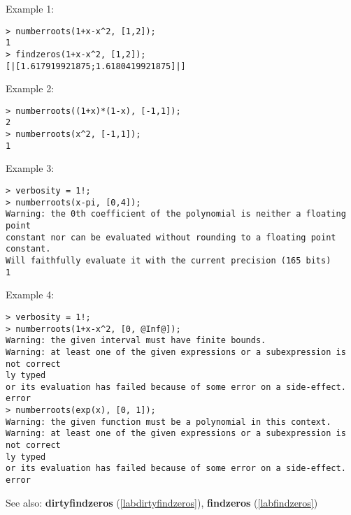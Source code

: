 \noindent Example 1: 
\begin{center}\begin{minipage}{15cm}\begin{Verbatim}[frame=single,commandchars=\\\|\~]
> numberroots(1+x-x^2, [1,2]);
1
> findzeros(1+x-x^2, [1,2]);
[|[1.617919921875;1.6180419921875]|]
\end{Verbatim}
\end{minipage}\end{center}
\noindent Example 2: 
\begin{center}\begin{minipage}{15cm}\begin{Verbatim}[frame=single,commandchars=\\\|\~]
> numberroots((1+x)*(1-x), [-1,1]);
2
> numberroots(x^2, [-1,1]);
1
\end{Verbatim}
\end{minipage}\end{center}
\noindent Example 3: 
\begin{center}\begin{minipage}{15cm}\begin{Verbatim}[frame=single,commandchars=\\\|\~]
> verbosity = 1!;
> numberroots(x-pi, [0,4]);
Warning: the 0th coefficient of the polynomial is neither a floating point
constant nor can be evaluated without rounding to a floating point constant.
Will faithfully evaluate it with the current precision (165 bits) 
1
\end{Verbatim}
\end{minipage}\end{center}
\noindent Example 4: 
\begin{center}\begin{minipage}{15cm}\begin{Verbatim}[frame=single,commandchars=\\\|\~]
> verbosity = 1!;
> numberroots(1+x-x^2, [0, @Inf@]);
Warning: the given interval must have finite bounds.
Warning: at least one of the given expressions or a subexpression is not correct
ly typed
or its evaluation has failed because of some error on a side-effect.
error
> numberroots(exp(x), [0, 1]);
Warning: the given function must be a polynomial in this context.
Warning: at least one of the given expressions or a subexpression is not correct
ly typed
or its evaluation has failed because of some error on a side-effect.
error
\end{Verbatim}
\end{minipage}\end{center}
See also: \textbf{dirtyfindzeros} (\ref{labdirtyfindzeros}), \textbf{findzeros} (\ref{labfindzeros})

